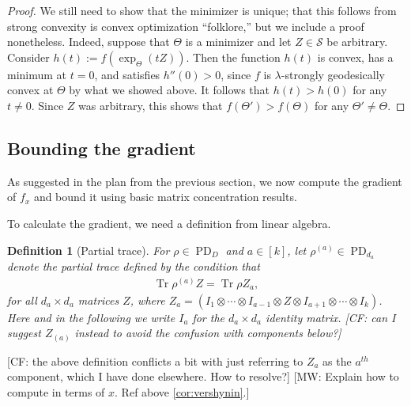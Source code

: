 \documentclass{article}
\newtheorem{definition}{Definition}
\newcommand{\ot}{\otimes}
\newcommand\PD{\operatorname{PD}}
\newcommand\Sym{\mathcal{S}}
\newcommand\samp{x}
\newcommand\tr{\operatorname{Tr}}
\newcommand{\CF}[1]{{\color{purple}[CF: #1]}}
\newcommand{\MW}[1]{{\color{red}[MW: #1]}}
\begin{document}
\begin{proof}

We still need to show that the minimizer is unique; that this follows from strong convexity is convex optimization ``folklore,'' but we include a proof nonetheless. Indeed, suppose that $\Theta$ is a minimizer and let $Z\in \Sym$ be arbitrary.
Consider $h(t) := f(\exp_{\Theta}(tZ))$.
Then the function $h(t)$ is convex, has a minimum at $t=0$, and satisfies $h''(0) > 0$, since $f$ is $\lambda$-strongly geodesically convex at $\Theta$ by what we showed above.
It follows that $h(t) > h(0)$ for any $t\neq0$.
Since $Z$ was arbitrary, this shows that $f(\Theta') > f(\Theta)$ for any $\Theta'\neq\Theta$.
\end{proof}

\subsection{Bounding the gradient}
As suggested in the plan from the previous section, we now compute the gradient of $f_{\samp}$ and bound it using basic matrix concentration results.

To calculate the gradient, we need a definition from linear algebra.

\begin{definition}[Partial trace]\label{def:single marginal}
For $\rho \in \PD_D$ and $a\in[k]$, let $\rho^{(a)} \in \PD_{d_a}$ denote the \emph{partial trace} defined by the condition that
\begin{align*}
  \tr \rho^{(a)} Z = \tr \rho Z_a,
\end{align*}
for all $d_a \times d_a$ matrices $Z$, where $Z_a = (I_1 \ot \cdots \ot I_{a-1} \ot Z \ot I_{a+1} \ot \cdots \ot I_k)$.
Here and in the following we write $I_a$ for the $d_a\times d_a$ identity matrix. \CF{can I suggest $Z_{(a)}$ instead to avoid the confusion with components below?}
\end{definition}
\CF{the above definition conflicts a bit with just referring to $Z_a$ as the $a^{th}$ component, which I have done elsewhere. How to resolve?}
\MW{Explain how to compute in terms of $\samp$. Ref above \cref{cor:vershynin}.}
\end{document}
